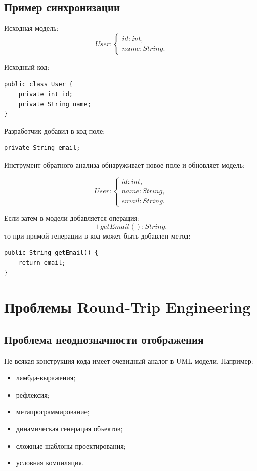 \documentclass[12pt,a4paper]{article}
\begin{document}
\subsection{Пример синхронизации}

Исходная модель:
\[
User:
\begin{cases}
id: int,\\
name: String.
\end{cases}
\]

Исходный код:

\begin{verbatim}
public class User {
    private int id;
    private String name;
}
\end{verbatim}

Разработчик добавил в код поле:

\begin{verbatim}
private String email;
\end{verbatim}

Инструмент обратного анализа обнаруживает новое поле и обновляет модель:

\[
User:
\begin{cases}
id: int,\\
name: String,\\
email: String.
\end{cases}
\]

Если затем в модели добавляется операция:
\[
+getEmail(): String,
\]
то при прямой генерации в код может быть добавлен метод:

\begin{verbatim}
public String getEmail() {
    return email;
}
\end{verbatim}

\section{Проблемы Round-Trip Engineering}

\subsection{Проблема неоднозначности отображения}

Не всякая конструкция кода имеет очевидный аналог в UML-модели. Например:
\begin{itemize}
    \item лямбда-выражения;
    \item рефлексия;
    \item метапрограммирование;
    \item динамическая генерация объектов;
    \item сложные шаблоны проектирования;
    \item условная компиляция.
\end{itemize}
\end{document}
